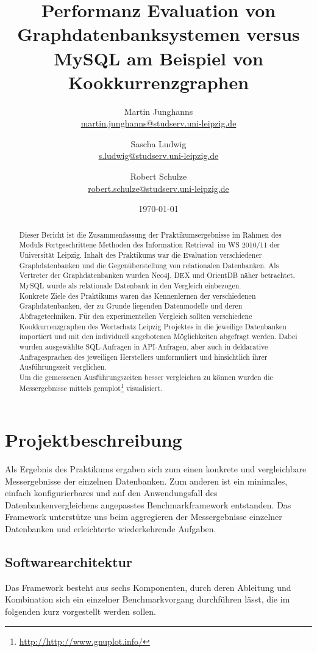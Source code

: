 \documentclass[11pt, a4paper, oneside]{article} %
\author{Martin Junghanns \\  \url{martin.junghanns@studserv.uni-leipzig.de} \and 
		Sascha Ludwig \\ \url{s.ludwig@studserv.uni-leipzig.de} \and 
		Robert Schulze \\ \url{robert.schulze@studserv.uni-leipzig.de} }
\date{\today}
\title{ Performanz Evaluation von Graphdatenbanksystemen versus MySQL am Beispiel von Kookkurrenzgraphen }
\begin{document}
\renewcommand{\labelitemi}{-}

\maketitle

\begin{abstract}
	Dieser Bericht ist die Zusammenfassung der Praktikumsergebnisse im Rahmen des Moduls \dq Fortgeschrittene Methoden des Information Retrieval\dq~im WS 2010/11 der Universität Leipzig. Inhalt des Praktikums war die Evaluation verschiedener Graphdatenbanken und die Gegenüberstellung von relationalen Datenbanken. Als Vertreter der Graphdatenbanken wurden Neo4j, DEX und OrientDB näher betrachtet, MySQL wurde als relationale Datenbank in den Vergleich einbezogen.\\
Konkrete Ziele des Praktikums waren das Kennenlernen der verschiedenen Graphdatenbanken, der zu Grunde liegenden Datenmodelle und deren Abfragetechniken. Für den experimentellen Vergleich sollten verschiedene Kookkurrenzgraphen des Wortschatz Leipzig Projektes in die jeweilige Datenbanken importiert und mit den individuell angebotenen Möglichkeiten abgefragt werden. Dabei wurden ausgewählte SQL-Anfragen in API-Anfragen, aber auch in deklarative Anfragesprachen des jeweiligen Herstellers umformuliert und hinsichtlich ihrer Ausführungszeit verglichen.\\
Um die gemessenen Ausführungszeiten besser vergleichen zu können wurden die Messergebnisse mittels genuplot\footnote{\url{http://http://www.gnuplot.info/}} visualisiert.
\end{abstract}

\section{Projektbeschreibung}
	Als Ergebnis des Praktikums ergaben sich zum einen konkrete und vergleichbare Messergebnisse der einzelnen Datenbanken. Zum anderen ist ein minimales, einfach konfigurierbares und auf den Anwendungsfall des Datenbankenvergleichens angepasstes Benchmarkframework entstanden. Das Framework unterstütze uns beim aggregieren der Messergebnisse einzelner Datenbanken und erleichterte wiederkehrende Aufgaben. 
	
\subsection{Softwarearchitektur}
Das Framework besteht aus sechs Komponenten, durch deren Ableitung und Kombination sich ein einzelner Benchmarkvorgang durchführen lässt, die im folgenden kurz vorgestellt werden sollen. 
\end{document}
